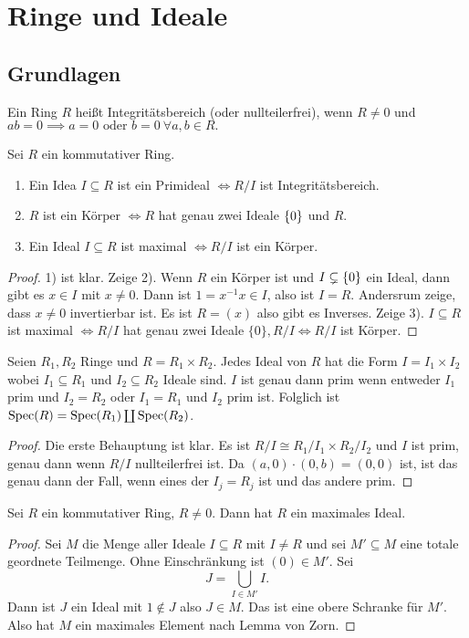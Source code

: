 \chapter{Ringe und Ideale}
\section{Grundlagen}
\begin{Def}
	Ein Ring \(R\) heißt Integritätsbereich (oder nullteilerfrei), wenn \(R\neq 0\) und \(ab=0\implies a=0 \text{ oder } b=0 \ \forall a,b\in R.\)
\end{Def}
\begin{Lemma} Sei \(R\) ein kommutativer Ring.
	\begin{enumerate}
		\item Ein Idea \(I\subseteq R\) ist ein Primideal \(\iff R/I\) ist Integritätsbereich.
		\item \(R\) ist ein Körper \(\iff R\) hat genau zwei Ideale \(\{0\}\) und \(R\).
		\item Ein Ideal \(I\subseteq R\) ist maximal \(\iff R/I\) ist ein Körper.
	\end{enumerate}
	\begin{proof}
		1) ist klar.
		Zeige 2). Wenn \(R\) ein Körper ist und \(I\subsetneq \{0\}\) ein Ideal, dann gibt es \(x\in I\) mit \(x\neq 0\). Dann ist \(1=x^{-1}x\in I\), also ist \(I=R\). Andersrum zeige, dass \(x\neq 0\) invertierbar ist. Es ist \(R=(x)\) also gibt es Inverses.
		Zeige 3). \(I\subseteq R\) ist maximal \(\iff R/I\) hat genau zwei Ideale \(\{0\}, R/I \iff R/I\) ist Körper.
	\end{proof}
	\begin{Lemma}\label{Lem:IdealeProduktring}
		Seien \(R_1,R_2\) Ringe und \(R=R_1\times R_2\). Jedes Ideal von \(R\) hat die Form \(I=I_1\times I_2\) wobei \(I_1\subseteq R_1\) und \(I_2\subseteq R_2\) Ideale sind. \(I\) ist genau dann prim wenn entweder \(I_1\) prim und \(I_2=R_2\) oder \(I_1=R_1\) und \(I_2\) prim ist.
		Folglich ist \(\operatorname{Spec}(R)=\operatorname{Spec}(R_1)\coprod \operatorname{Spec}(R_2)\).
	\end{Lemma}
	\begin{proof}
		Die erste Behauptung ist klar. Es ist \(R/I\cong R_1/I_1\times R_2/I_2\) und \(I\) ist prim, genau dann wenn \(R/I\) nullteilerfrei ist.
		Da \((a,0)\cdot (0,b)=(0,0)\) ist, ist das genau dann der Fall, wenn eines der \(I_j=R_j\) ist und das andere prim.
	\end{proof}
	
	\begin{Satz}\label{Satz:ExMaxId}
		Sei \(R\) ein kommutativer Ring, \(R\neq 0\). Dann hat \(R\) ein maximales Ideal.
	\end{Satz}
	\begin{proof}
		Sei \(M\) die Menge aller Ideale \(I\subseteq R\) mit \(I\neq R\) und sei \(M'\subseteq M\) eine totale geordnete Teilmenge.  Ohne Einschränkung ist \((0)\in M'\). Sei \[J=\bigcup\limits_{I\in M'}I.\] Dann ist \(J\) ein Ideal mit \(1\not\in J\) also \(J\in M\). Das ist eine obere Schranke für \(M'\). Also hat \(M\) ein maximales Element nach Lemma von Zorn.
	\end{proof}
\end{Lemma}
